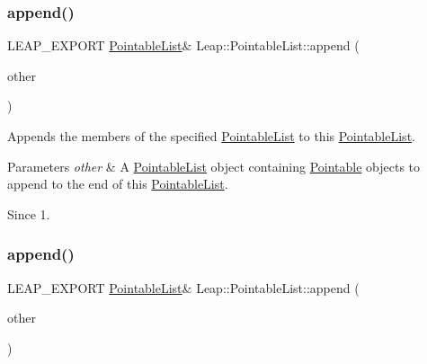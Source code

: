 \subsubsection{\texorpdfstring{append()}{append()}\hspace{0.1cm}{\footnotesize\ttfamily [1/3]}}
{\footnotesize\ttfamily L\+E\+A\+P\+\_\+\+E\+X\+P\+O\+RT \hyperlink{class_leap_1_1_pointable_list}{Pointable\+List}\& Leap\+::\+Pointable\+List\+::append (\begin{DoxyParamCaption}\item[{const \hyperlink{class_leap_1_1_pointable_list}{Pointable\+List} \&}]{other }\end{DoxyParamCaption})}

Appends the members of the specified \hyperlink{class_leap_1_1_pointable_list}{Pointable\+List} to this \hyperlink{class_leap_1_1_pointable_list}{Pointable\+List}. 
\begin{DoxyParams}{Parameters}
{\em other} & A \hyperlink{class_leap_1_1_pointable_list}{Pointable\+List} object containing \hyperlink{class_leap_1_1_pointable}{Pointable} objects to append to the end of this \hyperlink{class_leap_1_1_pointable_list}{Pointable\+List}. \\
\hline
\end{DoxyParams}
\begin{DoxySince}{Since}
1. 
\end{DoxySince}
\mbox{\label{class_leap_1_1_pointable_list_a8da39b0c202e3ade7aad666dcceddfdf}} 
\subsubsection{\texorpdfstring{append()}{append()}\hspace{0.1cm}{\footnotesize\ttfamily [2/3]}}
{\footnotesize\ttfamily L\+E\+A\+P\+\_\+\+E\+X\+P\+O\+RT \hyperlink{class_leap_1_1_pointable_list}{Pointable\+List}\& Leap\+::\+Pointable\+List\+::append (\begin{DoxyParamCaption}\item[{const \hyperlink{class_leap_1_1_finger_list}{Finger\+List} \&}]{other }\end{DoxyParamCaption})}

